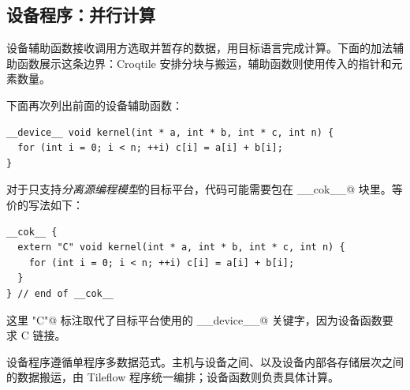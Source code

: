 \subsection*{设备程序：并行计算}

设备辅助函数接收调用方选取并暂存的数据，用目标语言完成计算。下面的加法辅助函数展示这条边界：Croqtile 安排分块与搬运，辅助函数则使用传入的指针和元素数量。

下面再次列出前面的设备辅助函数：

\begin{lstlisting}[language=croqtile,caption={从 tileflow 调用的设备辅助函数}]
__device__ void kernel(int * a, int * b, int * c, int n) {
  for (int i = 0; i < n; ++i) c[i] = a[i] + b[i];
}
\end{lstlisting}

对于只支持\emph{分离源编程模型}的目标平台，代码可能需要包在 \co@__cok__@ 块里。等价的写法如下：

\begin{lstlisting}[language=croqtile,caption={分离源所需的 cok 包装}]
__cok__ {
  extern "C" void kernel(int * a, int * b, int * c, int n) {
    for (int i = 0; i < n; ++i) c[i] = a[i] + b[i];
  }
} // end of __cok__
\end{lstlisting}

这里 \co@extern "C"@ 标注取代了目标平台使用的 \co@__device__@ 关键字，因为设备函数要求 C 链接。

设备程序遵循单程序多数据范式。主机与设备之间、以及设备内部各存储层次之间的数据搬运，由 Tileflow 程序统一编排；设备函数则负责具体计算。
